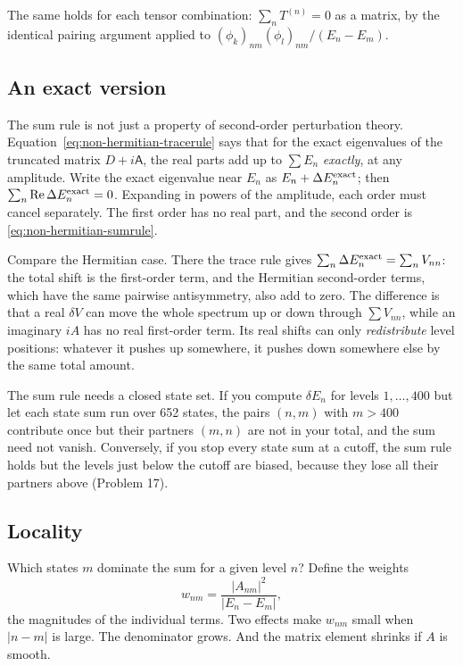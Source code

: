 The same holds for each tensor combination: $\sum_n T^{(n)}=0$ as a matrix, by the identical pairing argument applied to $(\phi_k)_{nm}(\phi_l)_{nm}/(E_n-E_m)$.

\subsection{An exact version}

The sum rule is not just a property of second-order perturbation theory. Equation~\eqref{eq:non-hermitian-tracerule} says that for the exact eigenvalues of the truncated matrix $D+i\mathsf A$, the real parts add up to $\sum E_n$ \emph{exactly}, at any amplitude. Write the exact eigenvalue near $E_n$ as $E_n+\Delta E_n^{\rm exact}$; then $\sum_n\Re\Delta E_n^{\rm exact}=0$. Expanding in powers of the amplitude, each order must cancel separately. The first order has no real part, and the second order is \eqref{eq:non-hermitian-sumrule}.

Compare the Hermitian case. There the trace rule gives $\sum_n\Delta E_n^{\rm exact} = \sum_nV_{nn}$: the total shift is the first-order term, and the Hermitian second-order terms, which have the same pairwise antisymmetry, also add to zero. The difference is that a real $\delta V$ can move the whole spectrum up or down through $\sum V_{nn}$, while an imaginary $iA$ has no real first-order term. Its real shifts can only \emph{redistribute} level positions: whatever it pushes up somewhere, it pushes down somewhere else by the same total amount.

\begin{pitfall}
The sum rule needs a closed state set. If you compute $\delta E_n$ for levels $1,\dots,400$ but let each state sum run over 652 states, the pairs $(n,m)$ with $m>400$ contribute once but their partners $(m,n)$ are not in your total, and the sum need not vanish. Conversely, if you stop every state sum at a cutoff, the sum rule holds but the levels just below the cutoff are biased, because they lose all their partners above (Problem 17).
\end{pitfall}

\subsection{Locality}

Which states $m$ dominate the sum for a given level $n$? Define the weights
\begin{equation}
w_{nm} = \frac{|A_{nm}|^2}{|E_n-E_m|},
\label{eq:non-hermitian-weights}
\end{equation}
the magnitudes of the individual terms. Two effects make $w_{nm}$ small when $|n-m|$ is large. The denominator grows. And the matrix element shrinks if $A$ is smooth.

